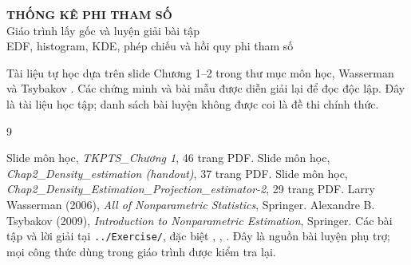 \documentclass[11pt,a4paper,oneside]{report}
\newcommand{\1}{\mathbf 1}
\theoremstyle{plain}
\theoremstyle{definition}
\begin{document}
\begin{center}
{\Large\bfseries THỐNG KÊ PHI THAM SỐ}\\[6pt]
{\large Giáo trình lấy gốc và luyện giải bài tập}\\[6pt]
EDF, histogram, KDE, phép chiếu và hồi quy phi tham số
\end{center}
\noindent Tài liệu tự học dựa trên slide Chương 1--2 trong thư mục môn học,
Wasserman \cite{wasserman} và Tsybakov \cite{tsybakov}.
Các chứng minh và bài mẫu được diễn giải lại để đọc độc lập.
Đây là tài liệu học tập; danh sách bài luyện không được coi là đề thi chính thức.
\tableofcontents







\appendix

\begin{thebibliography}{9}
 Slide môn học, \emph{TKPTS\_Chương 1}, 46 trang PDF.
 Slide môn học, \emph{Chap2\_Density\_estimation (handout)}, 37 trang PDF.
 Slide môn học, \emph{Chap2\_Density\_Estimation\_Projection\_estimator-2}, 29 trang PDF.
 Larry Wasserman (2006), \emph{All of Nonparametric Statistics}, Springer.
 Alexandre B. Tsybakov (2009), \emph{Introduction to Nonparametric Estimation}, Springer.
 Các bài tập và lời giải tại \texttt{../Exercise/}, đặc biệt
, ,
. Đây là nguồn bài luyện phụ trợ;
mọi công thức dùng trong giáo trình được kiểm tra lại.
\end{thebibliography}
\end{document}
